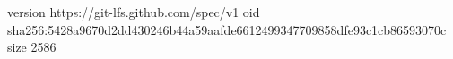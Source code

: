 version https://git-lfs.github.com/spec/v1
oid sha256:5428a9670d2dd430246b44a59aafde6612499347709858dfe93c1cb86593070c
size 2586
